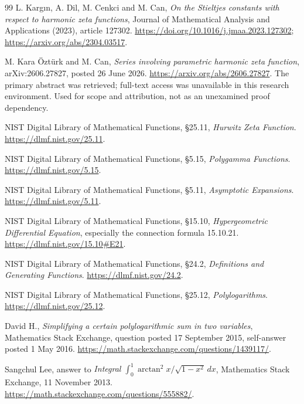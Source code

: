 \begin{thebibliography}{99}
L. Karg\i n, A. Dil, M. Cenkci and M. Can,
\emph{On the Stieltjes constants with respect to harmonic zeta functions},
Journal of Mathematical Analysis and Applications (2023), article 127302.
\url{https://doi.org/10.1016/j.jmaa.2023.127302};
\url{https://arxiv.org/abs/2304.03517}.

M. Kara \"Ozt\"urk and M. Can,
\emph{Series involving parametric harmonic zeta function},
arXiv:2606.27827, posted 26 June 2026.
\url{https://arxiv.org/abs/2606.27827}.
The primary abstract was retrieved; full-text access was unavailable
in this research environment. Used for scope and attribution, not as
an unexamined proof dependency.

NIST Digital Library of Mathematical Functions,
\S25.11, \emph{Hurwitz Zeta Function}.
\url{https://dlmf.nist.gov/25.11}.

NIST Digital Library of Mathematical Functions,
\S5.15, \emph{Polygamma Functions}.
\url{https://dlmf.nist.gov/5.15}.

NIST Digital Library of Mathematical Functions,
\S5.11, \emph{Asymptotic Expansions}.
\url{https://dlmf.nist.gov/5.11}.

NIST Digital Library of Mathematical Functions,
\S15.10, \emph{Hypergeometric Differential Equation}, especially
the connection formula 15.10.21.
\url{https://dlmf.nist.gov/15.10#E21}.

NIST Digital Library of Mathematical Functions,
\S24.2, \emph{Definitions and Generating Functions}.
\url{https://dlmf.nist.gov/24.2}.

NIST Digital Library of Mathematical Functions,
\S25.12, \emph{Polylogarithms}.
\url{https://dlmf.nist.gov/25.12}.

David H., \emph{Simplifying a certain polylogarithmic sum in two variables},
Mathematics Stack Exchange, question posted 17 September 2015,
self-answer posted 1 May 2016.
\url{https://math.stackexchange.com/questions/1439117/}.

Sangchul Lee, answer to
\emph{Integral $\int_0^1\arctan^2x/\sqrt{1-x^2}\,dx$},
Mathematics Stack Exchange, 11 November 2013.
\url{https://math.stackexchange.com/questions/555882/}.

\end{thebibliography}
